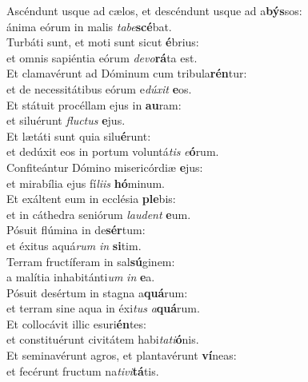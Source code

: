 \evenverse Ascéndunt usque ad cælos, et descéndunt usque ad a\textbf{býs}sos:~\*\\
\evenverse ánima eórum in malis \textit{ta}\textit{be}\textbf{scé}bat.\\
\oddverse Turbáti sunt, et moti sunt sicut \textbf{é}brius:~\*\\
\oddverse et omnis sapiéntia eórum \textit{de}\textit{vo}\textbf{rá}ta est.\\
\evenverse Et clamavérunt ad Dóminum cum tribula\textbf{rén}tur:~\*\\
\evenverse et de necessitátibus eórum e\textit{dú}\textit{xit} \textbf{e}os.\\
\oddverse Et státuit procéllam ejus in \textbf{au}ram:~\*\\
\oddverse et siluérunt \textit{flu}\textit{ctus} \textbf{e}jus.\\
\evenverse Et lætáti sunt quia silu\textbf{é}runt:~\*\\
\evenverse et dedúxit eos in portum voluntá\textit{tis} \textit{e}\textbf{ó}rum.\\
\oddverse Confiteántur Dómino misericórdiæ \textbf{e}jus:~\*\\
\oddverse et mirabília ejus fí\textit{li}\textit{is} \textbf{hó}minum.\\
\evenverse Et exáltent eum in ecclésia \textbf{ple}bis:~\*\\
\evenverse et in cáthedra seniórum \textit{lau}\textit{dent} \textbf{e}um.\\
\oddverse Pósuit flúmina in de\textbf{sér}tum:~\*\\
\oddverse et éxitus aquá\textit{rum} \textit{in} \textbf{si}tim.\\
\evenverse Terram fructíferam in sal\textbf{sú}ginem:~\*\\
\evenverse a malítia inhabitánti\textit{um} \textit{in} \textbf{e}a.\\
\oddverse Pósuit desértum in stagna a\textbf{quá}rum:~\*\\
\oddverse et terram sine aqua in éxi\textit{tus} \textit{a}\textbf{quá}rum.\\
\evenverse Et collocávit illic esuri\textbf{én}tes:~\*\\
\evenverse et constituérunt civitátem habi\textit{ta}\textit{ti}\textbf{ó}nis.\\
\oddverse Et seminavérunt agros, et plantavérunt \textbf{ví}neas:~\*\\
\oddverse et fecérunt fructum na\textit{ti}\textit{vi}\textbf{tá}tis.\\
